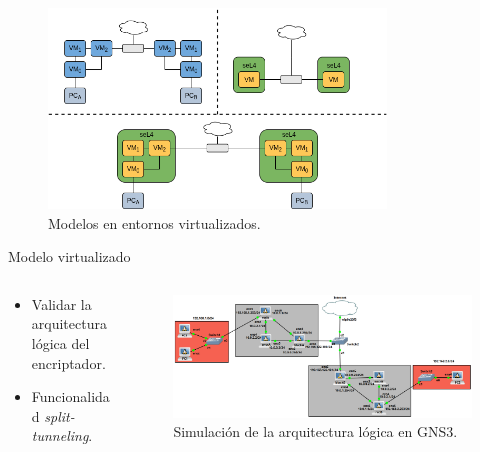 \documentclass[serif, aspectratio=169]{beamer}
\begin{document}
\begin{frame}
    \begin{figure}
        \centering
        \includegraphics[width=0.8\textwidth]{../../Tesis/figs/3_modelosall.png}
        \caption{Modelos en entornos virtualizados.}
    \end{figure}
\end{frame}

\begin{frame}{Modelo virtualizado}
    \begin{columns}
        \begin{column}{0.35\textwidth}
            \begin{itemize}
                \item Validar la arquitectura lógica del encriptador.
                \item Funcionalidad \textit{split-tunneling}.
            \end{itemize}
        \end{column}
        \begin{column}{0.6\textwidth}
            \begin{figure}
                \centering
                \includegraphics[width=\textwidth]{images/gns3_2.png}
                \caption{Simulación de la arquitectura lógica en GNS3.}
            \end{figure}
        \end{column}
    \end{columns}
\end{frame}
\end{document}
